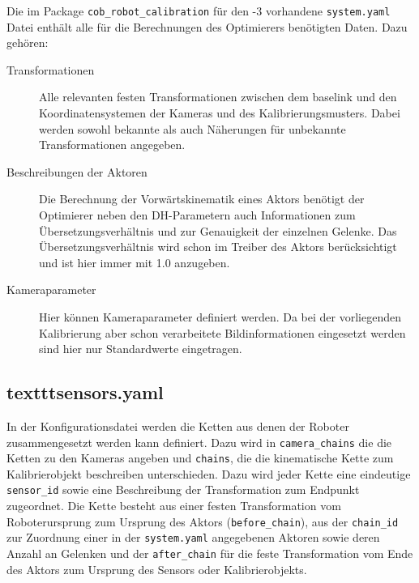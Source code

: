 Die im Package \texttt{cob\_robot\_calibration}
    für den -3 vorhandene \texttt{system.yaml} Datei enthält alle für die
    Berechnungen des Optimierers benötigten Daten. Dazu gehören:

    \begin{description}

      \item[Transformationen] Alle relevanten festen Transformationen zwischen
        dem \ac{baselink} und den Koordinatensystemen der Kameras und des
        Kalibrierungsmusters. Dabei werden sowohl bekannte als auch Näherungen
	für unbekannte Transformationen angegeben.

      \item[Beschreibungen der Aktoren] Die Berechnung der
        Vorwärtskinematik eines Aktors benötigt der Optimierer neben den
        \acl{DH-Parameter}n auch Informationen zum Übersetzungsverhältnis und
        zur Genauigkeit der einzelnen Gelenke. Das Übersetzungsverhältnis wird
        schon im Treiber des Aktors berücksichtigt und ist hier immer mit 1.0
        anzugeben.

      \item[Kameraparameter] Hier können Kameraparameter definiert werden. Da
        bei der vorliegenden Kalibrierung aber schon verarbeitete
        Bildinformationen eingesetzt werden sind hier nur Standardwerte
        eingetragen.

    \end{description}

  \subsection{texttt{sensors.yaml}} In der Konfigurationsdatei werden die Ketten aus
    denen der Roboter zusammengesetzt werden kann definiert. Dazu wird in
    \texttt{camera\_chains} die die Ketten zu den Kameras angeben und 
    \texttt{chains}, die die kinematische Kette zum Kalibrierobjekt beschreiben
    unterschieden.
    Dazu wird jeder Kette eine eindeutige \texttt{sensor\_id} sowie eine
    Beschreibung der Transformation zum Endpunkt zugeordnet. Die Kette besteht
    aus einer festen Transformation vom Roboterursprung zum Ursprung des Aktors
    (\texttt{before\_chain}), aus der \texttt{chain\_id} zur Zuordnung einer in
    der \texttt{system.yaml} angegebenen Aktoren sowie deren Anzahl an Gelenken 
    und der \texttt{after\_chain} für die feste Transformation vom Ende des Aktors
    zum Ursprung des Sensors oder Kalibrierobjekts.


